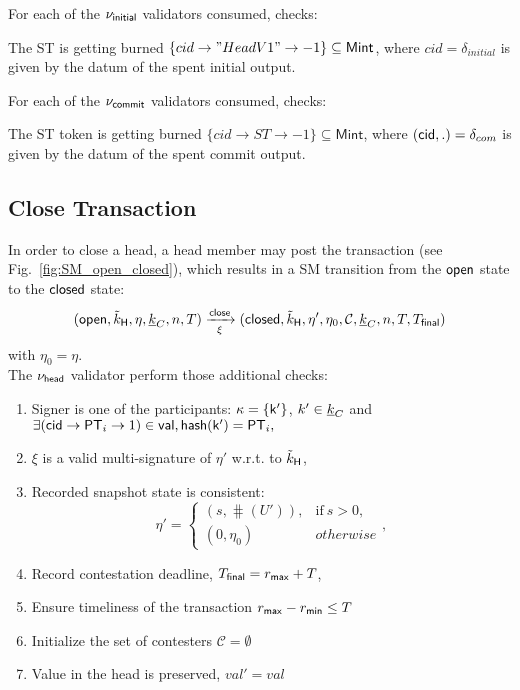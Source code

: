 \noindent For each of the $\nu_\mathsf{initial}$ validators consumed, checks:
\begin{menumerate}
  \item The ST is getting burned
  $\{cid \rightarrow "HeadV1" \rightarrow -1\} \subseteq \mathsf{Mint}$, where
  $cid = \delta_{initial}$ is given by the datum of the spent initial output.
\end{menumerate}

\noindent For each of the $\nu_\mathsf{commit}$ validators consumed, checks:
\begin{menumerate}
  \item The ST token is getting burned
  $\{cid \rightarrow ST \rightarrow -1\} \subseteq \mathsf{Mint}$, where
  $(\mathsf{cid},.) = \delta_{com}$ is given by the datum of the spent commit output.
\end{menumerate}

\subsection{Close Transaction}\label{sec:close-tx}



In order to close a head, a head member may post the \mtxClose{} transaction (see Fig.~\ref{fig:SM_open_closed}), which results in a SM transition
from the $\mathsf{open}$ state to the $\mathsf{closed}$ state:
$$
(\mathsf{open},\tilde{k}_{\mathsf{H}},\eta,\underline{k}_C,n,T) \xrightarrow[\xi]{\mathsf{close}} (\mathsf{closed},\tilde{k}_{\mathsf{H}},\eta',\eta_0,\mathcal{C},\underline{k}_C,n,T,T_{\mathsf{final}}) 
$$
with $\eta_0 = \eta$. \\

\noindent The $\nu_\mathsf{head}$ validator perform those additional checks:
\begin{enumerate}
  \item Signer is one of the participants: $\kappa = \{\mathsf{k'}\}$, $k' \in \underline{k}_C$ and
    $
    \exists (\mathsf{cid} \rightarrow \mathsf{PT}_i \rightarrow 1) \in \mathsf{val}, \mathsf{hash}(\mathsf{k'}) = \mathsf{PT}_i,
    $
  \item $\xi$ is a valid multi-signature of $\eta'$ w.r.t. to $\tilde{k}_{\mathsf{H}}$,
  \item Recorded snapshot state is consistent:
    $$
    \eta' = \left\{\begin{array}{ll}
         (s, \hash(U')), & \mathrm{if}\ s > 0,\\
         (0, \eta_0) & \mathit{otherwise} 
    \end{array}\right.,
    $$
  \item Record contestation deadline, $T_{\mathsf{final}} = r_{\mathsf{max}} + T$,
  \item Ensure timeliness of the transaction $r_{\mathsf{max}} - r_{\mathsf{min}} \leq T$ 
  \item Initialize the set of contesters $\mathcal{C} = \emptyset$
  \item Value in the head is preserved, $val' = val$
\end{enumerate}

